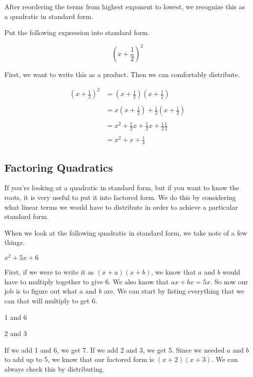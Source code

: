 After reordering the terms from highest exponent to lowest, we recognize this as a quadratic in standard form.

\begin{example}
Put the following expression into standard form.

$$(x + \frac{1}{2})^2$$

First, we want to write this as a product.  Then we can comfortably distribute.

$$\begin{array}{rl}
(x+\frac{1}{2})^2 & = (x+\frac{1}{2})(x+\frac{1}{2}) \\ & \\
& = x(x+\frac{1}{2})+ \frac{1}{2}(x+\frac{1}{2}) \\ & \\
& = x^2 + \frac{1}{2}x + \frac{1}{2}x + \frac{1}{2}\frac{1}{2} \\ & \\
& = x^2 + x + \frac{1}{4}
\end{array}$$
\end{example}

\subsection*{Factoring Quadratics}

If you're looking at a quadratic in standard form, but if you want to know the roots, it is very useful to put it into factored form.  We do this by considering what linear terms we would have to distribute in order to achieve a particular standard form.

\begin{example}

When we look at the following quadratic in standard form, we take note of a few things.

$x^2 + 5x + 6$

First, if we were to write it as $(x + a)(x + b)$, we know that $a$ and $b$ would have to multiply together to give 6.  We also know that $ax + bx = 5x$.  So now our job is to figure out what $a$ and $b$ are.  We can start by listing everything that we can that will multiply to get 6.

1 and 6

2 and 3

If we add 1 and 6, we get 7.  If we add 2 and 3, we get 5.  Since we needed $a$ and $b$ to add up to 5, we know that our factored form is $(x + 2)(x + 3)$.  We can always check this by distributing. 

\end{example}

